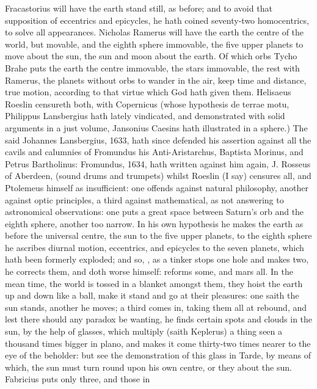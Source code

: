 {Fracastorius will have the earth stand still, as before; and to avoid
that supposition of eccentrics and epicycles, he hath coined
seventy-two homocentrics, to solve all appearances. Nicholas Ramerus
will have the earth the centre of the world, but movable, and the
eighth sphere immovable, the five upper planets to move about the sun,
the sun and moon about the earth. Of which orbs Tycho Brahe puts the
earth the centre immovable, the stars immovable, the rest with Ramerus,
the planets without orbs to wander in the air, keep time and distance,
true motion, according to that virtue which God hath given them.
Helisaeus Roeslin censureth both, with Copernicus (whose
hypothesis de terrae motu, Philippus Lansbergius hath lately
vindicated, and demonstrated with solid arguments in a just volume,
Jansonius Caesins hath illustrated in a sphere.) The said
Johannes Lansbergius, 1633, hath since defended his assertion against
all the cavils and calumnies of Fromundus his Anti-Aristarchus,
Baptista Morinus, and Petrus Bartholinus: Fromundus, 1634, hath written
against him again, J. Rosseus of Aberdeen, \etc{} (sound drums and
trumpets) whilst Roeslin (I say) censures all, and Ptolemeus himself as
insufficient: one offends against natural philosophy, another against
optic principles, a third against mathematical, as not answering to
astronomical observations: one puts a great space between Saturn's orb
and the eighth sphere, another too narrow. In his own hypothesis he
makes the earth as before the universal centre, the sun to the five
upper planets, to the eighth sphere he ascribes diurnal motion,
eccentrics, and epicycles to the seven planets, which hath been
formerly exploded; and so, , as a tinker stops one hole and makes two, he corrects
them, and doth worse himself: reforms some, and mars all. In the mean
time, the world is tossed in a blanket amongst them, they hoist the
earth up and down like a ball, make it stand and go at their pleasures:
one saith the sun stands, another he moves; a third comes in, taking
them all at rebound, and lest there should any paradox be wanting, he
finds certain spots and clouds in the sun, by the help of
glasses, which multiply (saith Keplerus) a thing seen a thousand times
bigger in plano, and makes it come thirty-two times nearer to the eye
of the beholder: but see the demonstration of this glass in
Tarde, by means of which, the sun must turn round upon his own
centre, or they about the sun. Fabricius puts only three, and those in
}
